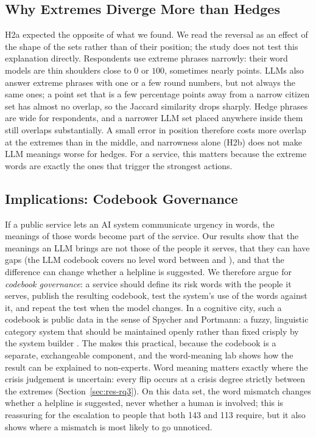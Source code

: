 \subsection{Why Extremes Diverge More than Hedges}
\label{sec:disc-shape}

H2a expected the opposite of what we found.
We read the reversal as an effect of the shape of the sets rather than of their position; the study does not test
this explanation directly.
Respondents use extreme phrases narrowly: their word models are thin shoulders close to $0$ or $100$, sometimes nearly
points.
LLMs also answer extreme phrases with one or a few round numbers, but not always the same ones; a point set that is a
few percentage points away from a narrow citizen set has almost no overlap, so the Jaccard similarity drops sharply.
Hedge phrases are wide for respondents, and a narrower LLM set placed anywhere inside them still overlaps substantially.
A small error in position therefore costs more overlap at the extremes than in the middle, and narrowness alone (H2b)
does not make LLM meanings worse for hedges.
For a service, this matters because the extreme words are exactly the ones that trigger the strongest actions.

\subsection{Implications: Codebook Governance}
\label{sec:disc-governance}

If a public service lets an AI system communicate urgency in words, the meanings of those words become part of the
service.
Our results show that the meanings an LLM brings are not those of the people it serves, that they can have gaps (the LLM
codebook covers no level word between \WthreeLlmGapLow{} and \WthreeLlmGapHigh{}), and that the difference can change
whether a helpline is suggested.
We therefore argue for \emph{codebook governance}: a service should define its risk words with the people it serves,
publish the resulting codebook, test the system's use of the words against it, and repeat the test when the model
changes.
In a cognitive city, such a codebook is public data in the sense of Spycher and Portmann: a fuzzy, linguistic
category system that should be maintained openly rather than fixed crisply by the system builder
\citep{spycher2026crispness}.
The \Perc{} makes this practical, because the codebook is a separate, exchangeable component, and the word-meaning lab
shows how the result can be explained to non-experts.
Word meaning matters exactly where the crisis judgement is uncertain: every flip occurs at a crisis degree strictly
between the extremes (Section~\ref{sec:res-rq3}).
On this data set, the word mismatch changes whether a helpline is suggested, never whether a human is involved; this is
reassuring for the escalation to people that both 143 and 113 require, but it also shows where a mismatch is most likely
to go unnoticed.

